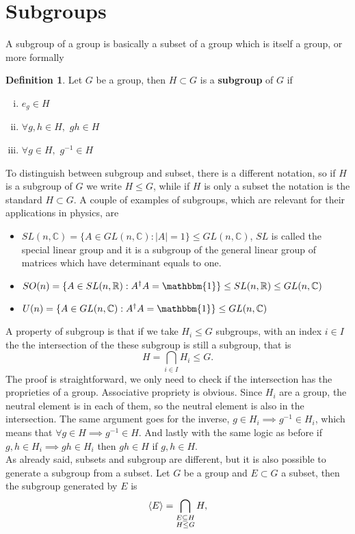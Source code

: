 \documentclass[12pt]{book}
\theoremstyle{plain}
\newcommand{\R}{\mathbb{R}}
\newcommand{\I}{\mathbbm{1}}
\newcommand{\C}{\mathbb{C}}
\renewcommand{\H}{\mathcal{H}}
\theoremstyle{definition}
\newtheorem{dfn}[thm]{Definition}
\theoremstyle{remark}
\begin{document}
\section{Subgroups}
A subgroup of a group is basically a subset of a group which is itself a group, or more formally
\begin{dfn}
Let $G$ be a group, then $H\subset G$ is a \textbf{subgroup} of $G$ if
\begin{enumerate}[i.]
	\item $e_g \in H$
	\item $\forall g,h \in H,$ $gh\in H$
	\item $\forall g\in H,$ $g^{-1}\in H$
\end{enumerate}
\end{dfn}
To distinguish between subgroup and subset, there is a different notation, so if $H$ is a subgroup of $G$ we write $H\leq G$, while if $H$ is only a subset the notation is the standard $H\subset G$. A couple of examples of subgroups, which are relevant for their applications in physics, are
\begin{itemize}
\item $SL(n,\C) = \{A\in GL(n,\C): |A| = 1\}\leq GL(n,\C)$, $SL$ is called the special linear group and it is a subgroup of the general linear group of matrices which have determinant equals to one.
\item $SO(n) = \{A\in SL(n,\R) : A^\dagger A = \I\}\leq SL(n,\R)\leq GL(n,\C)$ 
\item $U(n) = \{A\in GL(n,\C):A^\dagger A= \I \} \leq GL(n,\C)$
\end{itemize}
A property of subgroup is that if we take $H_i\leq G$ subgroups, with an index $i\in I$ the the intersection of the these subgroup is still a subgroup, that is
\[H = \bigcap_{i\in I} H_i \leq G.\]
The proof is straightforward, we only need to check if the intersection has the proprieties of a group. Associative propriety is obvious. Since $H_i$ are a group, the neutral element is in each of them, so the neutral element is also in the intersection. The same argument goes for the inverse, $g\in H_i \implies g^{-1}\in H_i$, which means that $\forall g\in H \implies g^{-1}\in H$. And lastly with the same logic as before if $g,h\in H_i\implies gh \in H_i$ then $gh\in H$ if $g,h\in H$.\\
As already said, subsets and subgroup are different, but it is also possible to generate a subgroup from a subset. Let $G$ be a group and $E\subset G$ a subset, then the subgroup generated by $E$ is
\[\braket{E} = \bigcap_{\substack{E\subseteq H\\H\leq G}} H,\]
\end{document}
